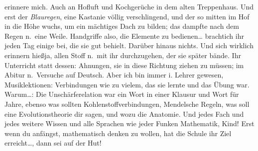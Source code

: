 \documentclass[
]{article}
\begin{document}
erinnere mich. Auch an Hofluft und Kochgerüche in dem alten Treppenhaus.
Und erst der \emph{Blauregen}, eine Kastanie völlig verschlingend, und
der so mitten im Hof in die Höhe wuchs, um ein mächtiges Dach zu bilden;
das dampfte nach dem Regen n.~eine Weile. Handgriffe also, die Elemente
zu bedienen\ldots{} brachtich ihr jeden Tag einige bei, die sie gut
behielt. Darüber hinaus nichts. Und sich wirklich erinnern hießja, allen
Stoff n.~mit ihr durchzugehen, der sie später bände. Ihr Unterricht
statt dessen: Ahnungen, sie in diese Richtung ziehen zu müssen; im
Abitur n.~Versuche auf Deutsch. Aber ich bin immer i. Lehrer gewesen,
Musiklektionen: Verbindungen wie zu vielem, das sie lernte und das Übung
war. Warum\ldots: Die Unschärferelation war ein Wort in einer Klausur
und Wort für Jahre, ebenso was sollten Kohlenstoffverbindungen,
Mendelsche Regeln, was soll eine Evolutionstheorie dir sagen, und wozu
die Anatomie. Und jedes Fach und jedes weitere Wissen und alle Sprachen
wie jeder Funken Mathematik, Kind! Erst wenn du anfängst, mathematisch
denken zu wollen, hat die Schule ihr Ziel erreicht\ldots, dann sei auf
der Hut!
\end{document}
